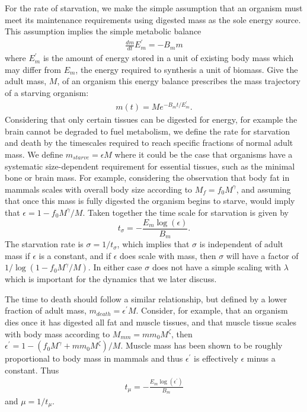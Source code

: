 \documentclass{pnastwo}
\begin{document}
\begin{article}
For the rate of starvation, we make the simple assumption that an organism must meet its maintenance requirements using digested mass as the sole energy source. This assumption implies the simple metabolic balance 
\begin{eqnarray}
\frac{dm}{dt}E_{m}^{\prime}=-B_{m}m
\end{eqnarray}
where $E_{m}^{\prime}$ is the amount of energy stored in a unit of existing body mass which may differ from  $E_{m}$, the energy required to synthesis a unit of biomass. Give the adult mass, $M$, of an organism this energy balance prescribes the mass trajectory of a starving organism:
\begin{eqnarray}
m\left(t\right)=Me^{-B_{m}t/E_{m}^{\prime}}.
\end{eqnarray}
Considering that only certain tissues can be digested for energy, for example the brain cannot be degraded to fuel metabolism, we define the rate for starvation and death by the timescales required to reach specific fractions of normal adult mass. We define $m_{starve}=\epsilon M$ where it could be the case that organisms have a systematic size-dependent requirement for essential tissues, such as the minimal bone or brain mass. For example, considering the observation that body fat in mammals scales with overall body size according to $M_{f}=f_{0}M^{\gamma}$, and assuming that once this mass is fully digested the organism begins to starve, would imply that $\epsilon=1-f_{0}M^{\gamma}/M$. Taken together the time scale for starvation is given by
\begin{equation}\label{eq:sigma}
t_{\sigma}=-\frac{E_{m}\log\left(\epsilon\right)}{B_{m}}.
\end{equation}
The starvation rate is $\sigma=1/t_{\sigma}$, which implies that $\sigma$ is independent of adult mass if $\epsilon$ is a constant, and if $\epsilon$ does scale with mass, then $\sigma$ will have a factor of $1/\log\left(1-f_{0}M^{\gamma}/M\right)$. In either case $\sigma$ does not have a simple scaling with $\lambda$ which is important for the dynamics that we later discuss. 

The time to death should follow a similar relationship, but defined by a lower fraction of adult mass, $m_{death}=\epsilon^{\prime} M$. Consider, for example, that an organism dies once it has digested all fat and muscle tissues, and that muscle tissue scales with body mass according to $M_{mm}=mm_{0}M^{\zeta}$, then $\epsilon^{\prime}=1-\left(f_{0}M^{\gamma}+mm_{0}M^{\zeta}\right)/M$. Muscle mass has been shown to be roughly proportional to body mass \cite{muscle} in mammals and thus  $\epsilon^{\prime}$ is effectively $\epsilon$ minus a constant. Thus
\begin{eqnarray}
t_{\mu}=-\frac{E_{m}\log\left(\epsilon^{\prime}\right)}{B_{m}}
\end{eqnarray}
and $\mu=1/t_{\mu}$. 


\end{article}
\end{document}
